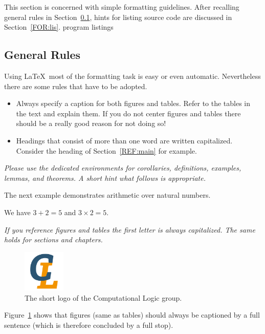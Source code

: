 \documentclass{howto}
\begin{document}
This section is concerned with simple formatting guidelines. After
recalling general rules in Section~\ref{FOR:gen}, hints for listing source
code are discussed in Section~\ref{FOR:lis}.
program listings

\subsection{General Rules}
\label{FOR:gen}
Using \LaTeX\ most of the formatting task is easy or even automatic.
Nevertheless there are some rules that have to be adopted.
\begin{itemize}
\item
Always specify a caption for both figures and tables. Refer to the tables in
the text and explain them. If you do not center figures and tables there
should be a really good reason for not doing so!
\item
Headings that consist of more than one word are written capitalized. Consider
the heading of Section~\ref{REF:main} for example.
\end{itemize}

\emph{
Please use the dedicated environments for corollaries, definitions,
examples, lemmas, and theorems. A short hint what follows is
appropriate.}

The next example demonstrates arithmetic over natural numbers.

\begin{example}
We have $3 + 2 = 5$ and $3 \times 2 = 5$.
\end{example}

\emph{If you reference figures and tables the first letter is always
capitalized. The same holds for sections and chapters.}

\begin{figure}[tb]
\begin{center}
\includegraphics[width=20mm]{clshortlogo_new.pdf}
\caption{The short logo of the Computational Logic group.}
\label{FIG:clshort}
\end{center}
\end{figure}

Figure~\ref{FIG:clshort} shows that figures (same as tables) should always
be captioned by a full sentence (which is therefore concluded by a full
stop).
\end{document}
